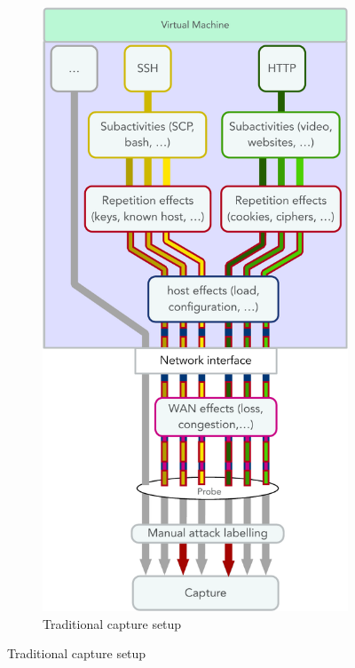 \documentclass{article}
\begin{document}
\begin{figure}
\centering
\begin{subfigure}[b]{0.46\textwidth}
\includegraphics[width=\textwidth]{images/VM_capture.pdf}
\caption{Traditional capture setup}
\end{subfigure}


\end{figure}
\end{document}
